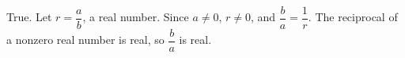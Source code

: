 True. Let $r=\dfrac {a}{b}$, a real number. Since $a\ne0$, $r\ne0$, and $\dfrac {b}{a}=\dfrac{1}{r}$. The reciprocal of a nonzero real number is real, so $\dfrac {b}{a}$ is real.
